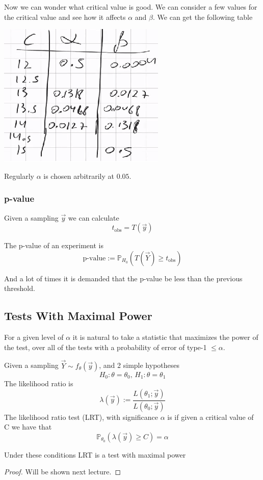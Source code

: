 \documentclass[../main.tex]{subfiles}
\begin{document}
\newpage
Now we can wonder what critical value is good. We can consider a few values for the critical value and see how it affects $\alpha$ and $\beta$. We can get the following table
\begin{center}
    \includegraphics{images/Table 2 For Stat Thoery.png}
\end{center}
Regularly $\alpha$ is chosen arbitrarily at $0.05$.
\subsubsection{p-value}
Given a sampling $\overrightarrow{y}$ we can calculate 
\[t_{\text{obs}} = T(\overrightarrow{y})\]
\begin{definition}
The p-value of an experiment is
\[\text{p-value}:=\mathbb{P}_{H_0}\left(T(\overrightarrow{Y})\geq t_{\text{obs}}\right)\]
\end{definition}
And a lot of times it is demanded that the p-value be less than the previous threshold.  
\newpage
\subsection{Tests With Maximal Power}
For a given level of $\alpha$ it is natural to take a statistic that maximizes the power of the test, over all of the tests with a probability of error of type-1 $\leq\alpha$. 
\begin{definition}
Given a sampling $\overrightarrow{Y}\sim f_{\theta}(\overrightarrow{y})$, and 2 simple hypotheses
\[H_0:\theta = \theta_0\text{, }H_1:\theta=\theta_1\]
The likelihood ratio is 
\[\lambda(\overrightarrow{y}):=\frac{L(\theta_1;\overrightarrow{y})}{L(\theta_0; \overrightarrow{y})}\]
The likelihood ratio test (LRT), with significance $\alpha$ is if given a critical value of C we have that
\[\mathbb{P}_{\theta_0}(\lambda(\overrightarrow{y})\geq C)=\alpha\]
\end{definition}
\begin{lemma}
Under these conditions LRT is a test with maximal power 
\end{lemma}
\begin{proof}
Will be shown next lecture. 
\end{proof}
\end{document}
